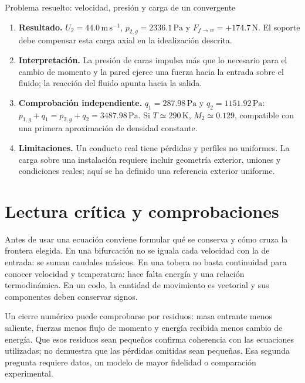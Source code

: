 \begin{studiumworked}{Problema resuelto: velocidad, presión y carga de un convergente}
\begin{enumerate}
\item \textbf{Resultado.} $U_2=44.0\,\mathrm{m\,s^{-1}}$, $p_{2,g}=2336.1\,\mathrm{Pa}$ y $F_{f\to w}=+174.7\,\mathrm{N}$. El soporte debe compensar esta carga axial en la idealización descrita.
\item \textbf{Interpretación.} La presión de caras impulsa más que lo necesario para el cambio de momento y la pared ejerce una fuerza hacia la entrada sobre el fluido; la reacción del fluido apunta hacia la salida.
\item \textbf{Comprobación independiente.} $q_1=287.98\,\mathrm{Pa}$ y $q_2=1151.92\,\mathrm{Pa}$: $p_{1,g}+q_1=p_{2,g}+q_2=3487.98\,\mathrm{Pa}$. Si $T\simeq290\,\mathrm{K}$, $M_2\simeq0.129$, compatible con una primera aproximación de densidad constante.
\item \textbf{Limitaciones.} Un conducto real tiene pérdidas y perfiles no uniformes. La carga sobre una instalación requiere incluir geometría exterior, uniones y condiciones reales; aquí se ha definido una referencia exterior uniforme.
\end{enumerate}


\end{studiumworked}

\section{Lectura crítica y comprobaciones}
Antes de usar una ecuación conviene formular qué se conserva y cómo cruza la frontera elegida. En una bifurcación no se iguala cada velocidad con la de entrada: se suman caudales másicos. En una tobera no basta continuidad para conocer velocidad y temperatura: hace falta energía y una relación termodinámica. En un codo, la cantidad de movimiento es vectorial y sus componentes deben conservar signos.

Un cierre numérico puede comprobarse por residuos: masa entrante menos saliente, fuerzas menos flujo de momento y energía recibida menos cambio de energía. Que esos residuos sean pequeños confirma coherencia con las ecuaciones utilizadas; no demuestra que las pérdidas omitidas sean pequeñas. Esa segunda pregunta requiere datos, un modelo de mayor fidelidad o comparación experimental.

